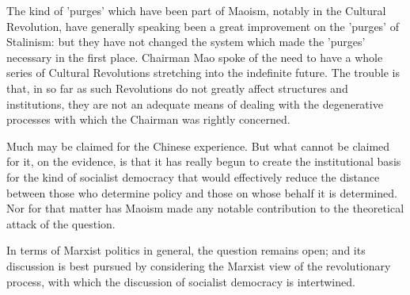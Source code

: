 The kind of 'purges' which have been part of Maoism, notably in the Cultural Revolution, have generally speaking been a great improvement on the 'purges' of Stalinism: but they have not changed the system which made the 'purges' necessary in the first place. Chairman Mao spoke of the need to have a whole series of Cultural Revolutions stretching into the indefinite future. The trouble is that, in so far as such Revolutions do not greatly affect structures and institutions, they are not an adequate means of dealing with the degenerative processes with which the Chairman was rightly concerned.

Much may be claimed for the Chinese experience. But what cannot be claimed for it, on the evidence, is that it has really begun to create the institutional basis for the kind of socialist democracy that would effectively reduce the distance between those who determine policy and those on whose behalf it is determined. Nor for that matter has Maoism made any notable contribution to the theoretical attack of the question.

In terms of Marxist politics in general, the question remains open; and its discussion is best pursued by considering the Marxist view of the revolutionary process, with which the discussion of socialist democracy is intertwined.

